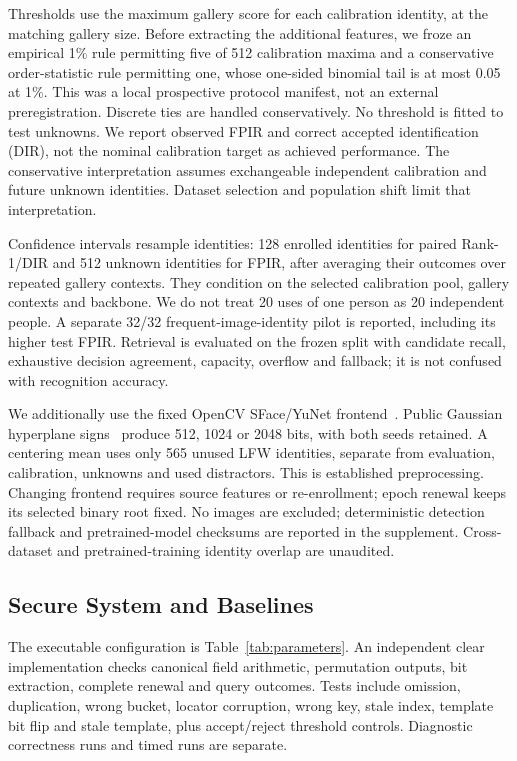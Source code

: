 \documentclass[journal]{IEEEtran}
\begin{document}
Thresholds use the maximum gallery score for each calibration identity, at the matching gallery size. Before extracting the additional features, we froze an empirical 1\% rule permitting five of 512 calibration maxima and a conservative order-statistic rule permitting one, whose one-sided binomial tail is at most 0.05 at 1\%. This was a local prospective protocol manifest, not an external preregistration. Discrete ties are handled conservatively. No threshold is fitted to test unknowns. We report observed FPIR and correct accepted identification (DIR), not the nominal calibration target as achieved performance. The conservative interpretation assumes exchangeable independent calibration and future unknown identities. Dataset selection and population shift limit that interpretation.

Confidence intervals resample identities: 128 enrolled identities for paired Rank-1/DIR and 512 unknown identities for FPIR, after averaging their outcomes over repeated gallery contexts. They condition on the selected calibration pool, gallery contexts and backbone. We do not treat 20 uses of one person as 20 independent people. A separate 32/32 frequent-image-identity pilot is reported, including its higher test FPIR. Retrieval is evaluated on the frozen split with candidate recall, exhaustive decision agreement, capacity, overflow and fallback; it is not confused with recognition accuracy.

We additionally use the fixed OpenCV SFace/YuNet frontend~\cite{opencv2026zoo}. Public Gaussian hyperplane signs~\cite{charikar2002similarity} produce 512, 1024 or 2048 bits, with both seeds retained. A centering mean uses only 565 unused LFW identities, separate from evaluation, calibration, unknowns and used distractors. This is established preprocessing. Changing frontend requires source features or re-enrollment; epoch renewal keeps its selected binary root fixed. No images are excluded; deterministic detection fallback and pretrained-model checksums are reported in the supplement. Cross-dataset and pretrained-training identity overlap are unaudited.

\subsection{Secure System and Baselines}\label{sec:system_protocol}
The executable configuration is Table~\ref{tab:parameters}. An independent clear implementation checks canonical field arithmetic, permutation outputs, bit extraction, complete renewal and query outcomes. Tests include omission, duplication, wrong bucket, locator corruption, wrong key, stale index, template bit flip and stale template, plus accept/reject threshold controls. Diagnostic correctness runs and timed runs are separate.
\end{document}
